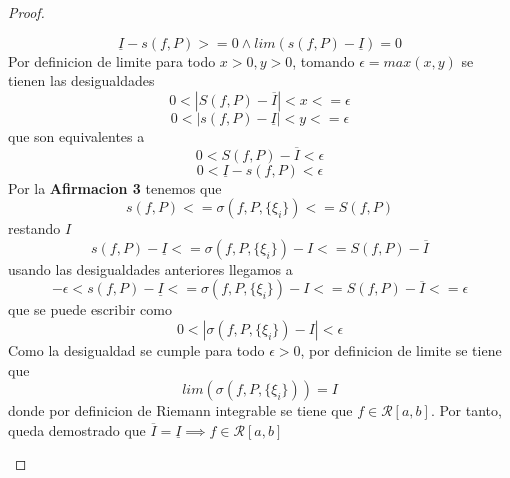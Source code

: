 \documentclass{article}
\begin{document}
\begin{proof}
\begin{enumerate}
\[
\underline{I} - s(f, P) >= 0 \wedge lim (s(f, P) - \underline{I}) = 0
\]
Por definicion de limite para todo \(x > 0, y > 0\), tomando \(\epsilon = max(x, y)\) se tienen las desigualdades 
\[
0< |S(f, P) - \overline{I} | < x <= \epsilon
\]
\[
0< |s(f, P) - \underline{I} | < y <= \epsilon 
\]
que son equivalentes a
\[
0< S(f, P) - \overline{I}  < \epsilon
\]
\[
0<  \underline{I} -  s(f, P)  < \epsilon
\]
Por la \textbf{Afirmacion 3} tenemos que 
\[
s(f, P) <= \sigma(f, P,\{\xi_i\}) <= S(f, P)
\]
restando \(I\)
\[
s(f, P) -\underline{I} <= \sigma(f, P,\{\xi_i\}) - I<= S(f, P) - \overline{I}
\]
usando las desigualdades anteriores llegamos a 
\[
-\epsilon < s(f, P) -\underline{I} <= \sigma(f, P,\{\xi_i\}) - I<= S(f, P) - \overline{I} <= \epsilon
\]
que se puede escribir como
\[
0 <|\sigma(f, P,\{\xi_i\}) - I |< \epsilon
\]
Como la desigualdad se cumple para todo \(\epsilon > 0\), por definicion de limite se tiene que 
\[
lim(\sigma(f, P,\{\xi_i\})) = I
\]
donde por definicion de Riemann integrable se tiene que \(f \in \mathcal{R}[a, b]\). Por tanto, queda demostrado que \( \overline{I} = \underline{I} \implies f \in \mathcal{R}[a, b] \)


\end{enumerate}

\end{proof}
\end{document}
